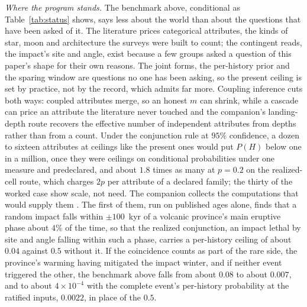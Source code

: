 \noindent\textit{Where the program stands.} The benchmark above, conditional as Table~\ref{tab:status} shows, says less about the world than about the questions that have been asked of it. The literature prices categorical attributes, the kinds of star, moon and architecture the surveys were built to count; the contingent reads, the impact's site and angle, exist because a few groups asked a question of this paper's shape for their own reasons. The joint forms, the per-history prior and the sparing window are questions no one has been asking, so the present ceiling is set by practice, not by the record, which admits far more. Coupling inference cuts both ways: coupled attributes merge, so an honest $m$ can shrink, while a cascade can price an attribute the literature never touched and the companion's landing-depth route recovers the effective number of independent attributes from depths rather than from a count. Under the conjunction rule at $95\%$ confidence, a dozen to sixteen attributes at ceilings like the present ones would put $P(H)$ below one in a million, once they were ceilings on conditional probabilities under one measure and predeclared, and about $1.8$ times as many at $p = 0.2$ on the realized-cell route, which charges $2p$ per attribute of a declared family; the thirty of the worked case show scale, not need. The companion collects the computations that would supply them \cite{Nexus}. The first of them, run on published ages alone, finds that a random impact falls within $\pm 100$~kyr of a volcanic province's main eruptive phase about $4\%$ of the time, so that the realized conjunction, an impact lethal by site and angle falling within such a phase, carries a per-history ceiling of about $0.04$ against $0.5$ without it. If the coincidence counts as part of the rare side, the province's warming having mitigated the impact winter, and if neither event triggered the other, the benchmark above falls from about $0.08$ to about $0.007$, and to about $4 \times 10^{-4}$ with the complete event's per-history probability at the ratified inputs, $0.0022$, in place of the $0.5$.



